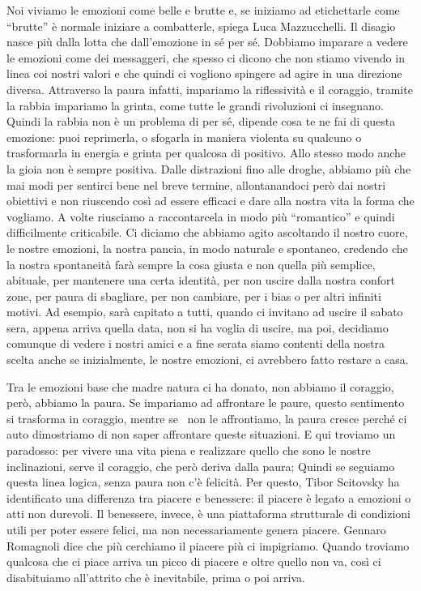 \documentclass[12pt]{book} %
\begin{document}
\bigskip

Noi viviamo le emozioni come belle e brutte e, se iniziamo ad etichettarle come “brutte” è normale iniziare a
combatterle, spiega Luca Mazzucchelli. Il disagio nasce più dalla lotta che dall'emozione in sé
per sé. Dobbiamo imparare a vedere le emozioni come dei messaggeri, che spesso ci dicono che non stiamo vivendo in
linea coi nostri valori e che quindi ci vogliono spingere ad agire in una direzione diversa. Attraverso la paura
infatti, impariamo la riflessività e il coraggio, tramite la rabbia impariamo la grinta, come tutte le grandi
rivoluzioni ci insegnano. Quindi la rabbia non è un problema di per sé, dipende cosa te ne fai di questa emozione: puoi
reprimerla, o sfogarla in maniera violenta su qualcuno o trasformarla in energia e grinta per qualcosa di positivo.
Allo stesso modo anche la gioia non è sempre positiva. Dalle distrazioni fino alle droghe, abbiamo più che mai modi per
sentirci bene nel breve termine, allontanandoci però dai nostri obiettivi e non riuscendo così ad essere efficaci e
dare alla nostra vita la forma che vogliamo. A volte riusciamo a raccontarcela in modo più “romantico” e quindi
difficilmente criticabile. Ci diciamo che abbiamo agito ascoltando il nostro cuore, le nostre emozioni, la nostra
pancia, in modo naturale e spontaneo, credendo che la nostra spontaneità farà sempre la cosa giusta e non quella più
semplice, abituale, per mantenere una certa identità, per non uscire dalla nostra confort zone, per paura di sbagliare,
per non cambiare, per i bias o per altri infiniti motivi. Ad esempio, sarà capitato a tutti, quando ci invitano ad
uscire il sabato sera, appena arriva quella data, non si ha voglia di uscire, ma poi, decidiamo comunque di vedere i
nostri amici e a fine serata siamo contenti della nostra scelta anche se inizialmente, le nostre emozioni, ci avrebbero
fatto restare a casa.

Tra le emozioni base che madre natura ci ha donato, non abbiamo il coraggio, però, abbiamo la paura. Se impariamo ad
affrontare le paure, questo sentimento si trasforma in coraggio, mentre se \ non le affrontiamo, la paura cresce perché
ci auto dimostriamo di non saper affrontare queste situazioni. E qui troviamo un paradosso: per vivere una vita piena e
realizzare quello che sono le nostre inclinazioni, serve il coraggio, che però deriva dalla paura; Quindi se seguiamo
questa linea logica, senza paura non c'è felicità. Per questo, Tibor Scitovsky ha identificato una differenza tra
piacere e benessere: il piacere è legato a emozioni o atti non durevoli. Il benessere, invece, è una piattaforma
strutturale di condizioni utili per poter essere felici, ma non necessariamente genera piacere. 
Gennaro Romagnoli dice che più cerchiamo il piacere più ci impigriamo. Quando troviamo qualcosa che ci piace arriva un picco di piacere e oltre quello non va, così ci disabituiamo all'attrito che è inevitabile, prima o poi arriva.
\end{document}
